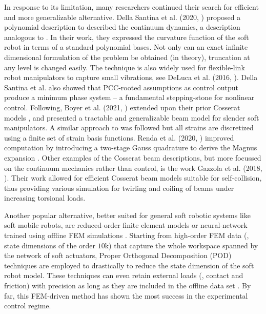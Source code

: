 In response to its limitation, many researchers continued their search for efficient and more generalizable alternative. Della Santina et al. (2020, \cite{DellaSantina2020}) proposed a polynomial description to described the continuum dynamics, a description analogous to \cite{Chirikjian1992}. In their work, they expressed the curvature function of the soft robot in terms of a standard polynomial bases. Not only can an exact infinite dimensional formulation of the problem be obtained (in theory), truncation at any level is changed easily. The technique is also widely used for flexible-link robot manipulators to capture small vibrations, see DeLuca et al. (2016, \cite{DeLuca2016Jul}). Della Santina et al. also showed that PCC-rooted assumptions as control output produce a minimum phase system \cite{DellaSantina2020} -- a fundamental stepping-stone for nonlinear control. Following, Boyer et al. (2021, \cite{Boyer2021}) extended upon their prior Cosserat models \cite{Renda2018,Renda2020}, and presented a tractable and generalizable beam model for slender soft manipulators. A similar approach to \cite{DellaSantina2020} was followed but all strains are discretized using a finite set of strain basis functions. Renda et al. (2020, \cite{Renda2020}) improved computation by introducing a two-stage Gauss quadrature \cite{Zanna1999} to derive the Magnus expansion \cite{Hairer2002}. Other examples of the Cosserat beam descriptions, but more focussed on the continuum mechanics rather than control, is the work Gazzola et al. (2018, \cite{Gazzola2018}). Their work allowed for efficient Cosserat beam models suitable for self-collision, thus providing various simulation for twirling and coiling of beams under increasing torsional loads.

Another popular alternative, better suited for general soft robotic systems like soft mobile robots, are reduced-order finite element models \cite{Duriez2013,Coevoet2017,Coevoet2017Feb,Goury2018,Thieffry2017,Thieffry2020,Tonkens2021May,Katzschmann2019Apr,Wu2021Feb,Zhang2017} or neural-network trained using offline FEM simulations \cite{Fang2020Dec}. Starting from high-order FEM data (\eg, state dimensions of the order $10$k) that capture the whole workspace spanned by the network of soft actuators, Proper Orthogonal Decomposition (POD) techniques are employed to drastically to reduce the state dimension of the soft robot model. These techniques can even retain external loads (\eg, contact and friction) with precision as long as they are included in the offline data set \cite{Goury2018}. By far, this FEM-driven method has shown the most success in the experimental control regime.

